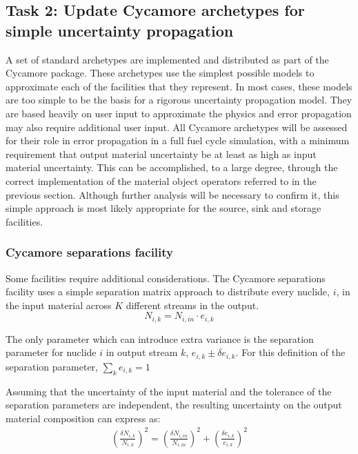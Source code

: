 \documentclass[dvips,12pt]{article}
\newcommand{\unc}[1]
{ \delta #1 }
\newcommand{\uncratio}[1]
{ \left(\frac{\unc{#1}}{#1}\right) }
\newcommand{\uncratiosq}[1]
{ \uncratio{#1}^2 }
\begin{document}
\subsection{Task 2: Update Cycamore archetypes for simple uncertainty propagation}

A set of standard archetypes are implemented and
distributed as part of the Cycamore package.
These archetypes use the simplest possible models
to approximate each of the facilities that they
represent.  In most cases, these models are too
simple to be the basis for a rigorous uncertainty
propagation model.  They are based heavily on user
input to approximate the physics and error
propagation may also require additional user
input.  All Cycamore archetypes will be assessed
for their role in error propagation in a full fuel
cycle simulation, with a minimum requirement that
output material uncertainty be at least as high as
input material uncertainty.  This can be
accomplished, to a large degree, through the
correct implementation of the material object
operators referred to in the previous section.
Although further analysis will be necessary to
confirm it, this simple approach is most likely
appropriate for the source, sink
and storage facilities.

\subsubsection{Cycamore separations facility}

Some facilities require additional considerations.
The Cycamore separations facility uses a simple
separation matrix approach to distribute every
nuclide, $i$, in the input material across $K$
different streams in the output.
\begin{equation}
N_{i,k} = N_{i,in} \cdot e_{i,k}
\end{equation}

The only parameter which can introduce extra
variance is the separation parameter for nuclide
$i$ in output stream $k$, $e_{i,k} \pm \delta
e_{i,k}$.  For this definition of the separation
parameter, $\sum_k e_{i,k} = 1$

Assuming that the uncertainty of the input
material and the tolerance of the separation
parameters are independent, the resulting
uncertainty on the output material composition can
express as:
\begin{align}
  \uncratiosq{N_{i,k}} = \uncratiosq{N_{i,in}} +  \uncratiosq{e_{i,k}}
\end{align}
\end{document}

